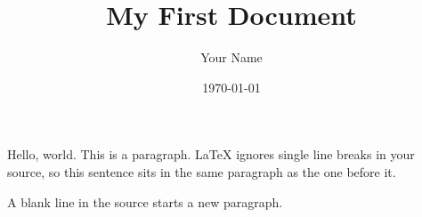 \documentclass[12pt]{article}
\title{My First Document}
\author{Your Name}
\date{\today} %
\begin{document}
\maketitle

Hello, world. This is a paragraph. LaTeX ignores single line breaks in
your source, so this sentence sits in the same paragraph as the one
before it.

A blank line in the source starts a new paragraph.
\end{document}
